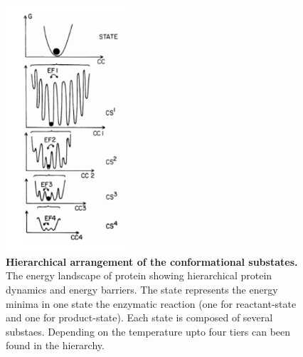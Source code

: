 \documentclass[11pt,a4paper,onecolumn]{article}
\begin{document}
\begin{figure} %
    \centering
    \includegraphics[width=0.4\textwidth]{energy_landscape}
    \caption{\textbf{Hierarchical arrangement of the conformational substates.} The energy landscape of protein showing hierarchical protein dynamics and energy barriers. The state represents the energy minima in one state the enzymatic reaction (one for reactant-state and one for product-state). Each state is composed of several substaes. Depending on the temperature upto four tiers can been found in the hierarchy.}
    \label{fig:energy_landscape}
\end{figure}
\end{document}
